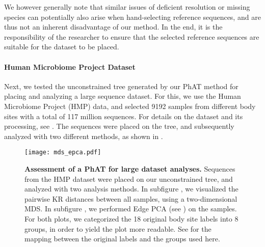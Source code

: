 We however generally note that similar issues of deficient resolution or missing species
can potentially also arise when hand-selecting reference sequences,
and are thus not an inherent disadvantage of our method.
In the end, it is the responsibility of the researcher to ensure that the selected reference sequences
are suitable for the dataset to be placed.

\paragraph{Human Microbiome Project Dataset}
\label{ch:AutomaticTrees:sec:Evaluation:sub:EmpiricalDatasets:par:HMP}

Next, we tested the unconstrained  tree generated by our \ac{PhAT} method
for placing and analyzing a large sequence dataset.
For this, we use the Human Microbiome Project (HMP) \citep{Huttenhower2012,Methe2012} data,
and selected \num{9192} samples from different body sites with a total of 117 million sequences.
For details on the dataset and its processing, see .
The sequences were placed on the tree, and subsequently analyzed with two different methods,
as shown in .

\begin{figure}[thb!]
    \centering
    \texttt{[image: mds\_epca.pdf]}
    \begin{subfigure}{0pt}
        \label{fig:hmp_mds_epca:sub:mds}
    \end{subfigure}
    \begin{subfigure}{0pt}
        \label{fig:hmp_mds_epca:sub:edge_pca}
    \end{subfigure}
    \caption[Assessment of a \acs{PhAT} for large dataset analyses]{
        \textbf{Assessment of a \acs{PhAT} for large dataset analyses.}
        Sequences from the HMP dataset \citep{Huttenhower2012,Methe2012} were placed
        on our unconstrained  tree, and analyzed with two analysis methods.
        In subfigure , we visualized the pairwise KR distances between all samples,
        using a two-dimensional \acf{MDS}.
        In subfigure , we performed Edge PCA
        (see ) on the samples.
        For both plots, we categorized the \num{18} original body site labels into \num{8} groups,
        in order to yield the plot more readable.
        See  for the mapping between the original labels and the groups used here.
    }
    \label{fig:hmp_mds_epca}
\end{figure}

